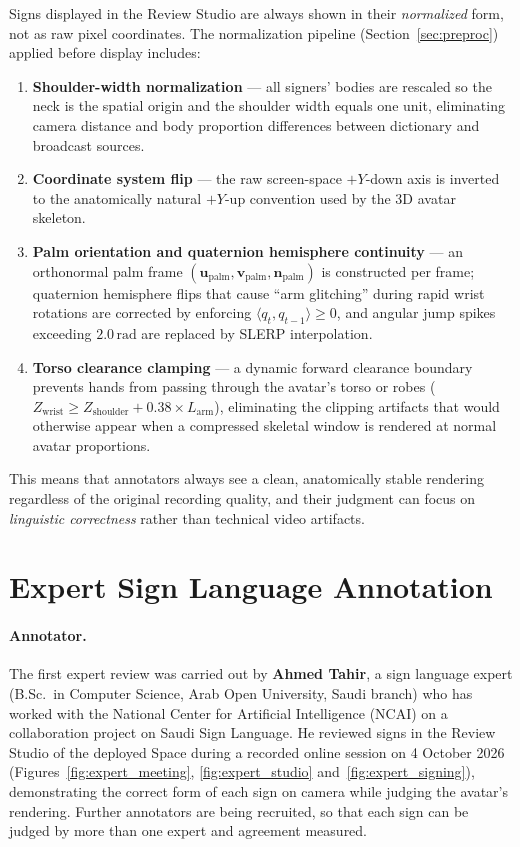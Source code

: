 Signs displayed in the Review Studio are always shown in their \emph{normalized} form, not as raw
pixel coordinates.  The normalization pipeline (Section~\ref{sec:preproc}) applied before display
includes:
\begin{enumerate}[leftmargin=*,itemsep=2pt]
  \item \textbf{Shoulder-width normalization} --- all signers' bodies are rescaled so the neck
    is the spatial origin and the shoulder width equals one unit, eliminating camera distance and
    body proportion differences between dictionary and broadcast sources.
  \item \textbf{Coordinate system flip} --- the raw screen-space $+Y$-down axis is inverted to
    the anatomically natural $+Y$-up convention used by the 3D avatar skeleton.
  \item \textbf{Palm orientation and quaternion hemisphere continuity} --- an orthonormal palm
    frame $(\mathbf{u}_{\text{palm}}, \mathbf{v}_{\text{palm}}, \mathbf{n}_{\text{palm}})$ is
    constructed per frame; quaternion hemisphere flips that cause ``arm glitching'' during rapid
    wrist rotations are corrected by enforcing $\langle q_t, q_{t-1}\rangle \ge 0$, and angular
    jump spikes exceeding $2.0\,\text{rad}$ are replaced by SLERP interpolation.
  \item \textbf{Torso clearance clamping} --- a dynamic forward clearance boundary prevents hands
    from passing through the avatar's torso or robes ($Z_{\text{wrist}} \ge Z_{\text{shoulder}} +
    0.38 \times L_{\text{arm}}$), eliminating the clipping artifacts that would otherwise appear
    when a compressed skeletal window is rendered at normal avatar proportions.
\end{enumerate}
This means that annotators always see a clean, anatomically stable rendering regardless of the
original recording quality, and their judgment can focus on \emph{linguistic correctness} rather
than technical video artifacts.

\section{Expert Sign Language Annotation}
\label{sec:annotators}

\paragraph{Annotator.} The first expert review was carried out by \textbf{Ahmed Tahir}, a sign language expert
(B.Sc.\ in Computer Science, Arab Open University, Saudi branch) who has worked with the National Center for
Artificial Intelligence (NCAI) on a collaboration project on Saudi Sign Language. He reviewed signs in the Review Studio of the
deployed Space during a recorded online session on 4 October 2026 (Figures~\ref{fig:expert_meeting}, \ref{fig:expert_studio}
and~\ref{fig:expert_signing}), demonstrating the correct form of each sign on camera while judging the avatar's rendering.
Further annotators are being recruited, so that each sign can be judged by more than one expert and agreement measured.


